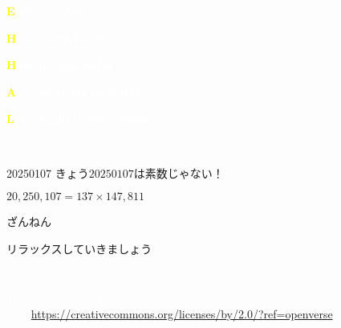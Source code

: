 \documentclass[aspectratio=169,xcolor={dvipsnames,table}]{beamer}
\makeatletter
\newcommand*{\themonth}{\two@digits\month}
\newcommand*{\theday}{\two@digits\day}
\newcommand{\mytoday}{{\the\year}--{\themonth}--{\theday}}
\makeatother
\begin{document}
\begin{frame}
\raggedleft
  \textcolor{white}{\Huge\bfseries \textcolor{yellow}{E}nglish is fun.}

\vfill

\vfill

\raggedleft
 \textcolor{white}{\LARGE\bfseries \textcolor{yellow}{H}ello, everybody!}

 \textcolor{white}{\LARGE\bfseries \textcolor{yellow}{H}ow are you today?}

\raggedleft
 \textcolor{white}{\LARGE\bfseries \textcolor{yellow}{A}re you ready to start?}

 \textcolor{white}{\LARGE\bfseries \textcolor{yellow}{L}et's begin today's lesson.}

\vfill

\raggedleft
 \textcolor{white}{\Large \bfseries \mytoday}

\hyperlink{today}{}
\end{frame}
%
%
%
%
\begin{frame}[plain]{20250107}
 \Large
\centering
\pause
\vfill
きょう$20250107$は素数\pause{}じゃない！\pause

$20{,}250{,}107=137\times{}147{,}811$\pause

ざんねん\pause

リラックスしていきましょう
\vfill
\raggedleft
\hyperlink{today}{}
\end{frame}
{
  \begin{frame}[b]
    \frametitle{}
\tiny
\raggedright
  \textcolor{white}{ ``Fireworks'' by bayasaa is licensed under CC BY 2.0. }\\
   \textcolor{white}{To view a copy of this license,}\\
   \textcolor{white}{visit \url{https://creativecommons.org/licenses/by/2.0/?ref=openverse}.}
\hfill\hyperlink{today}{}
  \end{frame}
}
\end{document}
